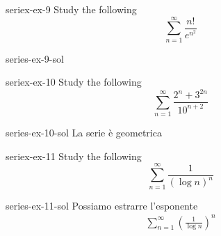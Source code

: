 \documentclass[preview]{standalone}
\begin{document}
\begin{snippetexercise}{seriex-ex-9}{}
    Study the following \series
    \[
        \sum_{n=1}^\infty \frac{
            n!
        }{
            e^{n^2}
        }
    \]
\end{snippetexercise}

\begin{snippetsolution}{series-ex-9-sol}{}
    \todo
\end{snippetsolution}

\begin{snippetexercise}{seriex-ex-10}{}
    Study the following \series
    \[
        \sum_{n=1}^\infty \frac{
            2^n + 3^{2n}
        }{
            10^{n+2}
        }
    \]
\end{snippetexercise}

\begin{snippetsolution}{series-ex-10-sol}{}
    La serie è geometrica
\end{snippetsolution}

\begin{snippetexercise}{seriex-ex-11}{}
    Study the following \series
    \[
        \sum_{n=1}^\infty \frac{
            1
        }{
            {(\log n)}^n
        }
    \]
\end{snippetexercise}

\begin{snippetsolution}{series-ex-11-sol}{}
    Possiamo estrarre l'esponente
    \begin{align*} %
        \sum_{n=1}^\infty {\left(\frac{
            1
        }{
            \log n
        }\right)}^n
    \end{align*}
    \todo
\end{snippetsolution}
\end{document}
